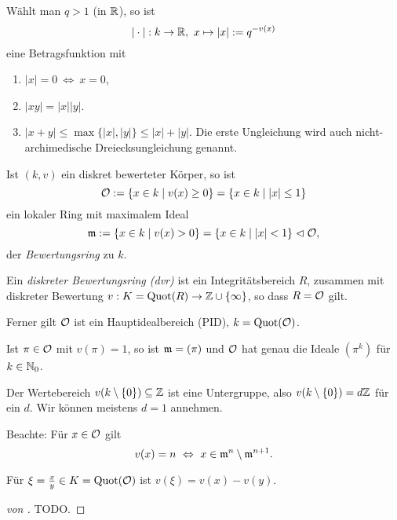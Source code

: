 \begin{bemerkung}
	Wählt man $q > 1$ (in $\mathbb{R}$), so ist
	\[
		|\cdot |: k \to \mathbb{R},\ x\mapsto |x| := q^{-v(x)}
	\]
	eine Betragsfunktion mit
	\begin{enumerate}
	  \item $|x| = 0 \ \Leftrightarrow\ x = 0$,
	  \item $|xy| = |x||y|$.
	  \item $|x+y| \leq \max \{ |x|,|y|\} \leq |x| + |y|$.
	   Die erste Ungleichung wird auch nicht-archimedische
	   Dreiecksungleichung genannt.
	\end{enumerate}
\end{bemerkung}


\begin{definition}[Bewertungsring]
	\label{def:bewertungsring}
	Ist $(k,v)$ ein diskret bewerteter Körper, so ist
	\[
		\mathcal{O}:= \{x\in k\mid v(x) \geq 0 \} = \{ x \in k \mid |x|\leq 1\}
	\]
	ein lokaler Ring mit maximalem Ideal
	\[
		\mathfrak{m} := \{x\in k\mid v(x) > 0\} = \{ x \in k\mid |x|< 1\} \vartriangleleft \mathcal{O},
	\]
	der \emph{Bewertungsring} zu $k$.
	
	Ein \emph{diskreter Bewertungsring (dvr)} ist ein Integritätsbereich $R$,
	zusammen mit diskreter Bewertung $v: K = \operatorname{Quot}(R) \to \mathbb{Z} \cup \{\infty\}$,
	so dass $R = \mathcal{O}$ gilt.
	
	Ferner gilt $\mathcal{O}$ ist ein Hauptidealbereich (PID), $k = \operatorname{Quot}(\mathcal{O})$.
	
	Ist $\pi\in \mathcal{O}$ mit $v(\pi) = 1$, so ist 
	$\mathfrak{m} = (\pi)$ und $\mathcal{O}$ hat genau die Ideale $(\pi^k)$ für $k\in \mathbb{N}_0$.
\end{definition}


\begin{bemerkung}
	Der Wertebereich $v(k\setminus \{0\}) \subseteq \mathbb{Z}$ ist eine Untergruppe,
	also $v(k\setminus \{0\}) = d \mathbb{Z}$ für ein $d$. 
	Wir können meistens \obda $d = 1$ annehmen.	
\end{bemerkung}

\begin{bemerkung}
	Beachte: Für $x\in \mathcal{O}$ gilt
	\[ v(x) = n \ \Leftrightarrow \ x \in \mathfrak{m}^n \setminus \mathfrak{m}^{n+1}. \]
	
	Für $\xi = \frac x y \in K = \operatorname{Quot}(\mathcal{O})$ ist $v(\xi) = v(x) - v(y)$.
\end{bemerkung}


\begin{proof}[von ]
	TODO.
\end{proof}

